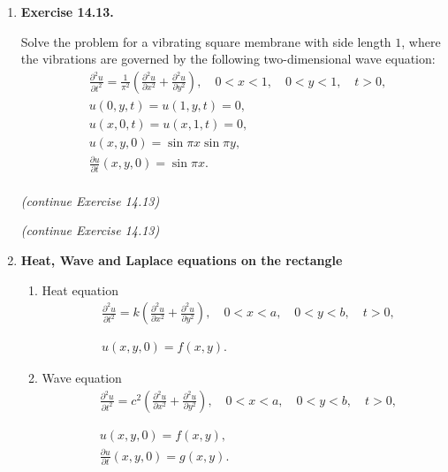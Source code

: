 \begin{enumerate}

\item \textbf{Exercise 14.13.}

Solve the problem for a vibrating square membrane with side length $1$, where the vibrations are governed by the following two-dimensional wave equation:
\begin{align*}
    & \frac{\partial^{2} u}{\partial t^{2}} = \frac{1}{\pi^{2}}\left(\frac{\partial^{2} u}{\partial x^{2}} + \frac{\partial^{2} u}{\partial y^{2}}\right), \quad 0<x<1 , \quad 0<y<1 , \quad t>0, \\
    & u(0,y,t) = u(1,y,t) = 0,\\
    & u(x,0,t) = u(x,1,t) = 0,\\
    & u(x,y,0) = \sin \pi x \sin \pi y, \\
    & \frac{\partial u}{\partial t}(x,y,0) = \sin \pi x. \\
\end{align*}


\newpage 
\textit{(continue Exercise 14.13)}

\newpage 
\textit{(continue Exercise 14.13)}

\newpage

\item \textbf{Heat, Wave and Laplace equations on the rectangle}

\begin{enumerate}

    \item Heat equation
    \begin{align*}
        & \frac{\partial^{2} u}{\partial t^{2}} = k\left(\frac{\partial^{2} u}{\partial x^{2}} + \frac{\partial^{2} u}{\partial y^{2}}\right), \quad 0<x<a , \quad 0<y<b , \quad t>0, \\
        & \\
        & \\
        & u(x,y,0) = f(x,y).
    \end{align*}
    \vspace{60pt}

    \item Wave equation
    \begin{align*}
        & \frac{\partial^{2} u}{\partial t^{2}} = c^{2}\left(\frac{\partial^{2} u}{\partial x^{2}} + \frac{\partial^{2} u}{\partial y^{2}}\right), \quad 0<x<a , \quad 0<y<b , \quad t>0, \\
        & \\
        & \\
        & u(x,y,0) = f(x,y), \\
        & \frac{\partial u}{\partial t}(x,y,0) = g(x,y). \\
    \end{align*}
    \vspace{60pt}


\end{enumerate}
\end{enumerate}
